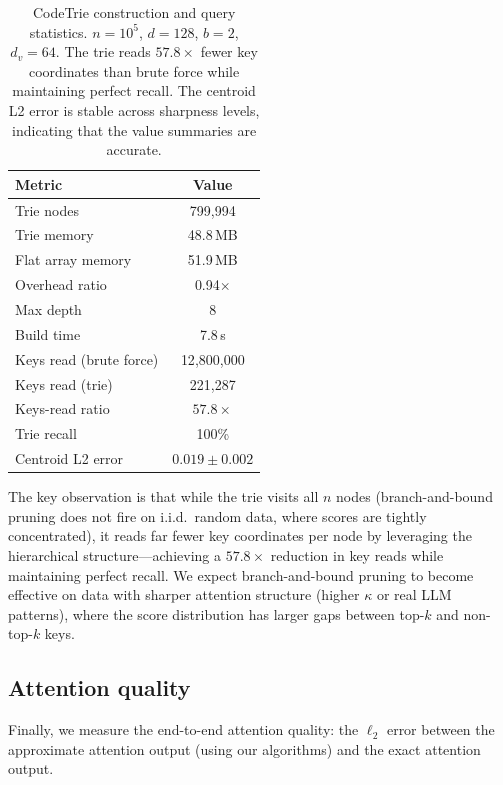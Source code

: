 \documentclass[10pt,twocolumn]{article}
\theoremstyle{definition}
\begin{document}
\begin{table}[htbp]
  \centering
  \caption{CodeTrie construction and query statistics.
  $n = 10^5$, $d = 128$, $b = 2$, $d_v = 64$.  The trie reads $57.8\times$
  fewer key coordinates than brute force while maintaining perfect recall.
  The centroid L2 error is stable across sharpness levels, indicating that
  the value summaries are accurate.}
  \label{tab:codetrie}
  \begin{tabular}{@{}lc@{}}
    \toprule
    Metric & Value \\
    \midrule
    Trie nodes & 799{,}994 \\
    Trie memory & 48.8\,MB \\
    Flat array memory & 51.9\,MB \\
    Overhead ratio & 0.94$\times$ \\
    Max depth & 8 \\
    Build time & 7.8\,s \\
    \midrule
    Keys read (brute force) & 12{,}800{,}000 \\
    Keys read (trie) & 221{,}287 \\
    Keys-read ratio & $57.8\times$ \\
    Trie recall & 100\% \\
    Centroid L2 error & $0.019 \pm 0.002$ \\
    \bottomrule
  \end{tabular}
\end{table}

The key observation is that while the trie visits all $n$ nodes (branch-and-bound
pruning does not fire on i.i.d.\ random data, where scores are tightly
concentrated), it reads far fewer key coordinates per node by leveraging the
hierarchical structure---achieving a $57.8\times$ reduction in key reads while
maintaining perfect recall.  We expect branch-and-bound pruning to become
effective on data with sharper attention structure (higher $\kappa$ or real LLM
patterns), where the score distribution has larger gaps between top-$k$ and
non-top-$k$ keys.

\subsection{Attention quality}
\label{sec:exp_quality}

Finally, we measure the end-to-end attention quality: the $\ell_2$ error
between the approximate attention output (using our algorithms) and the exact
attention output.
\end{document}
